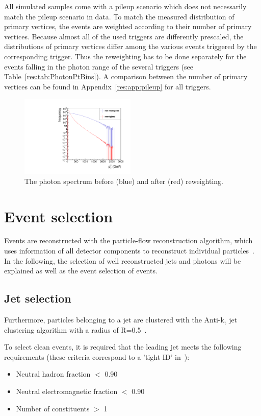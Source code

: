 All simulated samples come with a pileup scenario which does not necessarily match the pileup scenario in data. 
To match the measured distribution of primary vertices, the events are weighted according to their number of primary vertices. 
Because almost all of the used triggers are differently prescaled, the distributions of primary vertices differ among the various events triggered by the corresponding trigger.
Thus the reweighting has to be done separately for the events falling in the photon \pt range of the several triggers (see Table~\ref{res:tab:PhotonPtBins}).
A comparison between the number of primary vertices can be found in Appendix~\ref{res:app:pileup} for all triggers.
\begin{figure}[h]
  \centering
      \includegraphics[width=0.49\textwidth]{figures/resolution/eventSelection/PhotonPtComparison_reweighted.pdf} 
  \caption{The photon \pt spectrum before (blue) and after (red) reweighting.}  
  \label{res:fig:PhotonPtSpectrum}
\end{figure}


\section{Event selection}
\label{res:sec:EventSelection}
Events are reconstructed with the particle-flow reconstruction algorithm, which uses information of all detector components to reconstruct individual particles~\cite{CMS-PAS-PFT-09-001}.
In the following, the selection of well reconstructed jets and photons will be explained as well as the event selection of \GAMJET events.

\subsection{Jet selection}
Furthermore, particles belonging to a jet are clustered with the Anti-k$_{\text{t}}$ jet clustering algorithm with a radius of R=0.5~\cite{Cacciari:2008gp}.

To select clean \GAMJET events, it is required that the leading jet meets the following requirements (these criteria correspond to a 'tight ID' in~\cite{bib:JetIDRecommendation_7TeV,bib:AN:JetId_8TeV}):
\begin{itemize}

 \item Neutral hadron fraction $<$ 0.90
 \item Neutral electromagnetic fraction $<$ 0.90
 \item Number of constituents $>$ 1
\end{itemize}


